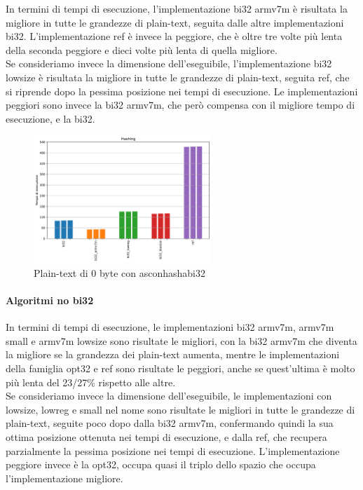 \documentclass[12pt,a4paper,italian]{report}
\begin{document}
In termini di tempi di esecuzione, l'implementazione bi32 armv7m è risultata la migliore in tutte le grandezze di plain-text, seguita dalle altre implementazioni bi32. L'implementazione ref è invece la peggiore, che è oltre tre volte più lenta della seconda peggiore e dieci volte più lenta di quella migliore. \\

\noindent Se consideriamo invece la dimensione dell'eseguibile, l'implementazione bi32 lowsize è risultata la migliore in tutte le grandezze di plain-text, seguita ref, che si riprende dopo la pessima posizione nei tempi di esecuzione. Le implementazioni peggiori sono invece la bi32 armv7m, che però compensa con il migliore tempo di esecuzione, e la bi32.

\begin{figure}[H]
    \centering
    \includegraphics[width=0.6\textwidth]{arduino/asconhashabi32.pdf}
    \caption{Plain-text di 0 byte con asconhashabi32}
\end{figure}

\paragraph{Algoritmi no bi32}

In termini di tempi di esecuzione, le implementazioni bi32 armv7m, armv7m small e armv7m lowsize sono risultate le migliori, con la bi32 armv7m che diventa la migliore se la grandezza dei plain-text aumenta, mentre le implementazioni della famiglia opt32 e ref sono risultate le peggiori, anche se quest'ultima è molto più lenta del 23/27\% rispetto alle altre. \\

\noindent Se consideriamo invece la dimensione dell'eseguibile, le implementazioni con lowsize, lowreg e small nel nome sono risultate le migliori in tutte le grandezze di plain-text, seguite poco dopo dalla bi32 armv7m, confermando quindi la sua ottima posizione ottenuta nei tempi di esecuzione, e dalla ref, che recupera parzialmente la pessima posizione nei tempi di esecuzione. L'implementazione peggiore invece è la opt32, occupa quasi il triplo dello spazio che occupa l'implementazione migliore.
\end{document}
